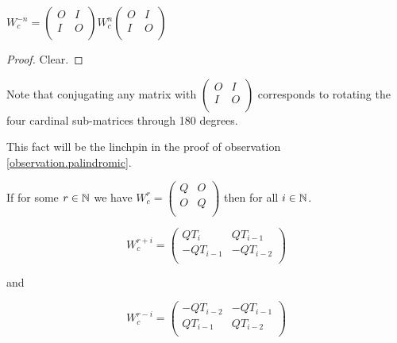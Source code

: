 \begin{corollary}
  $W_{c}^{-n} =
  \left(\begin{smallmatrix} O & I \\ I & O \\\end{smallmatrix}\right)
  W_{c}^{n}
  \left(\begin{smallmatrix} O & I \\ I & O \\\end{smallmatrix}\right)$
\end{corollary}

\begin{proof}
  Clear.
\end{proof}

Note that conjugating any matrix with
$\left(\begin{smallmatrix} O & I \\ I & O \\\end{smallmatrix}\right)$ 
corresponds to rotating the four cardinal sub-matrices through 180 degrees.

This fact will be the linchpin in the proof of observation
\ref{observation.palindromic}.

\begin{lemma}
  If for some $r\in\mathbb{N}$ we have $W_{c}^{r} = \left(\begin{smallmatrix} Q & O \\ O & Q \\\end{smallmatrix}\right)$ then for all $i\in\mathbb{N}$.

  \[
  W_{c}^{r+i} = \left(\begin{array}{cc} QT_{i} & QT_{i-1} \\ -QT_{i-1} & -QT_{i-2} \\\end{array}\right)
  \]

  and

  \[
  W_{c}^{r-i} = \left(\begin{array}{cc} -QT_{i-2} & -QT_{i-1} \\ QT_{i-1} & QT_{i-2} \\\end{array}\right)
  \]
\end{lemma}

